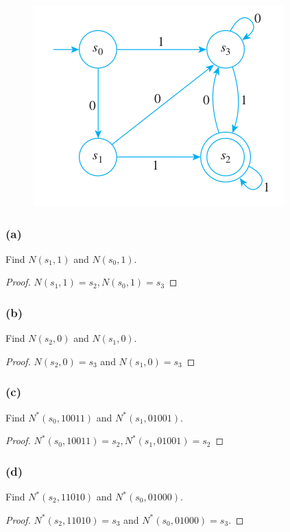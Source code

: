 \documentclass[14pt]{extarticle}
\begin{document}
\begin{figure}[ht!]
\centering
\includegraphics[scale=0.5]{../images/12.2.10.png}
\end{figure}

\subsubsection{(a)}
Find \(N(s_1, 1)\) and \(N(s_0, 1)\).
\begin{proof}
\(N(s_1, 1) = s_2, N(s_0, 1) = s_3\)
\end{proof}

\subsubsection{(b)}
Find \(N(s_2, 0)\) and \(N(s_1, 0)\).
\begin{proof}
\(N(s_2, 0) = s_3\) and \(N(s_1, 0) = s_3\)
\end{proof}

\subsubsection{(c)}
Find \(N^*(s_0, 10011)\) and \(N^*(s_1, 01001)\).
\begin{proof}
\(N^*(s_0, 10011) = s_2, N^*(s_1, 01001) = s_2\)
\end{proof}


\subsubsection{(d)}
Find \(N^*(s_2, 11010)\) and \(N^*(s_0, 01000)\).
\begin{proof}
\(N^*(s_2, 11010) = s_3\) and \(N^*(s_0, 01000) = s_3\).
\end{proof}
\end{document}
